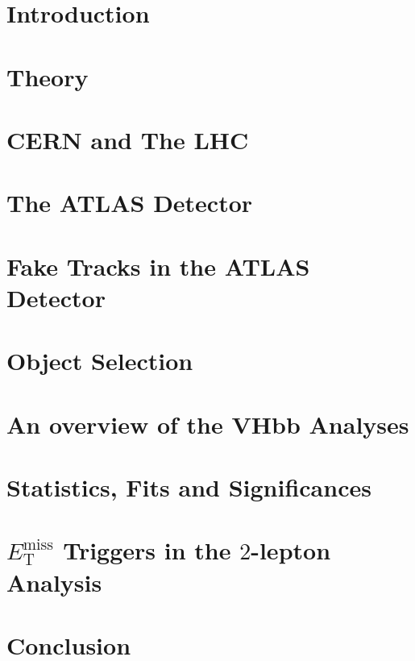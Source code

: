\documentclass[12pt,titlepage,oneside]{book}
\newcommand{\met}{\ensuremath{E_{\text{T}}^{\text{miss}}} }            %
\newcommand{\tlep}{\ensuremath{2}-lepton }
\begin{document}
\doublespacing

\mainmatter %

\chapter{Introduction}
\label{chap:intro}


\chapter{Theory}
\label{chap:theory}


\chapter{CERN and The LHC}
\label{chap:CERNLHC}


\chapter{The ATLAS Detector}
\label{chap:ATLAS}


\chapter{Fake Tracks in the ATLAS Detector}
\label{chap:FakeTracks}


\chapter{Object Selection}
\label{chap:ObjSel}


\chapter{An overview of the VHbb Analyses}
\label{chap:Analyses}


\chapter{Statistics, Fits and Significances}
\label{chap:Statfits}


\chapter{\met Triggers in the \tlep Analysis}
\label{chap:METTriggerStudy}


\chapter{Conclusion}
\label{chap:conc}


\backmatter  %


\end{document}
